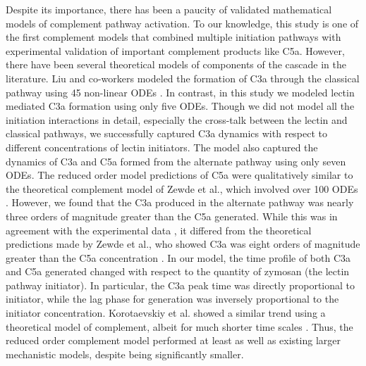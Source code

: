 \documentclass[12pt]{article}
\begin{document}
Despite its importance, there has been a paucity of validated mathematical models of complement pathway activation.
To our knowledge, this study is one of the first complement models that combined multiple initiation pathways with experimental validation of important complement products like C5a.
However, there have been several theoretical models of components of the cascade in the literature.
Liu and co-workers modeled the formation of C3a through the classical pathway using 45 non-linear ODEs  \cite{liu2011computational}.
In contrast, in this study we modeled lectin mediated C3a formation using only five ODEs.
Though we did not model all the initiation interactions in detail, especially the cross-talk between the lectin and classical pathways,
we successfully captured C3a dynamics with respect to different concentrations of lectin initiators.
The model also captured the dynamics of C3a and C5a formed from the alternate pathway using only seven ODEs.
The reduced order model predictions of C5a were qualitatively similar to the theoretical complement model of Zewde et al., which involved over 100 ODEs \cite{zewde2016quantitative}.
However, we found that the C3a produced in the alternate pathway was nearly three orders of magnitude greater than the C5a generated.
While this was in agreement with the experimental data \cite{morad2015time},
it differed from the theoretical predictions made by Zewde et al., who showed C3a was eight orders of magnitude greater than the C5a concentration \cite{zewde2016quantitative}.
In our model, the time profile of both C3a and C5a generated changed with respect to the quantity of zymosan (the lectin pathway initiator).
In particular, the C3a peak time was directly proportional to initiator, while the lag phase for generation was inversely proportional to the initiator concentration.
Korotaevskiy et al. showed a similar trend using a theoretical model of complement, albeit for much shorter time scales \cite{korotaevskiy2009non}.
Thus, the reduced order complement model performed at least as well as existing larger mechanistic models, despite being significantly smaller.
\end{document}
